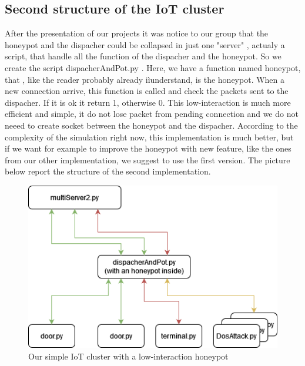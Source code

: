 \subsection{ Second structure of the IoT cluster}
After the presentation of our projects it was notice to our group that the honeypot and the dispacher could be collapsed in just one "server" , actualy a script, that handle all the function of the dispacher and the honeypot.  So we create the script dispacherAndPot.py . Here, we have a function named honeypot, that , like the reader probably already iìunderstand, is the honeypot. When a new connection arrive, this function is called and check the packets sent to the dispacher. If it is ok it return 1, otherwise 0. This low-interaction is much more efficient and simple, it do not lose packet from pending connection and we do not neeed to create socket between the honeypot and the dispacher. According to the complexity of the simulation right now, this implementation is much better, but if we want for example to improve the honeypot with new feature, like the ones from our other implementation, we suggest to use the first version. The picture below report the structure of the second implementation. 
\begin{figure}[h!]
  \centering
  \includegraphics[width = 12cm]{images/lowInterationHoneypot.drawio.png}
  \caption{Our simple IoT cluster with a low-interaction honeypot}
  \label{fig:DosImpl2}
\end{figure}
\FloatBarrier
\noindent






